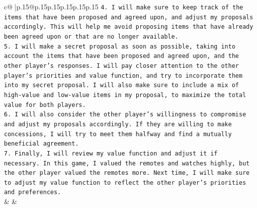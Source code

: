 \documentclass{article}
\begin{document}
{\begin{supertabular}{c@{$\;$}|p{.15\linewidth}@{}p{.15\linewidth}p{.15\linewidth}p{.15\linewidth}p{.15\linewidth}p{.15\linewidth}}
{{{\texttt{4.  I will make sure to keep track of the items that have been proposed and agreed upon, and adjust my proposals accordingly. This will help me avoid proposing items that have already been agreed upon or that are no longer available.} \\
\texttt{5.  I will make a secret proposal as soon as possible, taking into account the items that have been proposed and agreed upon, and the other player's responses. I will pay closer attention to the other player's priorities and value function, and try to incorporate them into my secret proposal. I will also make sure to include a mix of high{-}value and low{-}value items in my proposal, to maximize the total value for both players.} \\
\texttt{6.  I will also consider the other player's willingness to compromise and adjust my proposals accordingly. If they are willing to make concessions, I will try to meet them halfway and find a mutually beneficial agreement.} \\
\texttt{7.  Finally, I will review my value function and adjust it if necessary. In this game, I valued the remotes and watches highly, but the other player valued the remotes more. Next time, I will make sure to adjust my value function to reflect the other player's priorities and preferences.} \\
            }
        }
    }
    & & \\ \\


\end{supertabular}}
\end{document}
